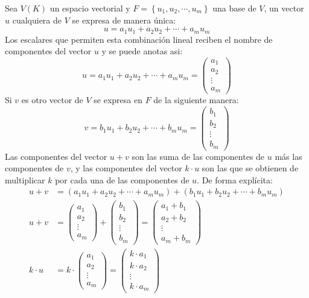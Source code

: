 Sea \(V(K)\) un espacio vectorial y \(F = \left\{u_1,u_2,\cdots,u_m\right\}\) una base de \(V\), un vector \(u\) cualquiera de \(V\) se expresa de manera única:
\[
  u = a_1 u_1 + a_2 u_2 + \cdots + a_m u_m
\]
Los escalares que permiten esta combinación lineal reciben el nombre de componentes del vector \(u\) y se puede anotas asi:
\[
  u = a_1 u_1 + a_2 u_2 + \cdots + a_m u_m = \begin{pmatrix}
    a_1 \\ a_2 \\ \vdots \\ a_m
  \end{pmatrix}
\]
Si \(v\) es otro vector de \(V\) se expresa en \(F\) de la siguiente manera:
\[
  v = b_1 u_1 + b_2 u_2 + \cdots + b_m u_m = \begin{pmatrix}
    b_1 \\ b_2 \\ \vdots \\ b_m
  \end{pmatrix}
\]
Las componentes del vector \(u+v\) son las suma de las componentes de \(u\) más las componentes de \(v\), y las componentes del vector \(k\cdot u\) son las que se obtienen de multiplicar \(k\) por cada una de las componentes de \(u\). De forma explícita:
\begin{align*}
  u + v &= (a_1 u_1 + a_2 u_2 + \cdots + a_m u_m) + (b_1 u_1 + b_2 u_2 + \cdots + b_m u_m) \\[3pt]
  u + v &= \begin{pmatrix}
    a_1 \\ a_2 \\ \vdots \\ a_m
  \end{pmatrix} + \begin{pmatrix}
    b_1 \\ b_2 \\ \vdots \\ b_m
  \end{pmatrix} = \begin{pmatrix}
    a_1 + b_1 \\ a_2 + b_2 \\ \vdots \\ a_m + b_m
  \end{pmatrix} \\[10pt]
  k\cdot u &= k \cdot \begin{pmatrix}
    a_1 \\ a_2 \\ \vdots \\ a_m
  \end{pmatrix} = \begin{pmatrix}
    k \cdot a_1 \\ k \cdot a_2 \\ \vdots \\ k \cdot a_m
  \end{pmatrix}
\end{align*}

